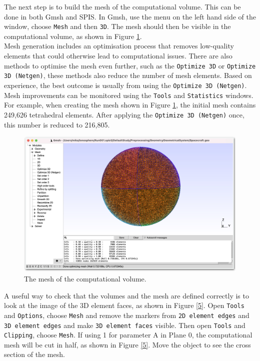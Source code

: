 \documentclass[a4paper, 12pt]{article}
\begin{document}
The next step is to build the mesh of the computational volume. This can be done in both Gmsh and SPIS. In Gmsh, use the menu on the left hand side of the window, choose \verb|Mesh| and then \verb|3D|. The mesh should then be visible in the computational volume, as shown in Figure \ref{4}.\\

Mesh generation includes an optimisation process that removes low-quality elements that could otherwise lead to computational issues. There are also methods to optimise the mesh even further, such as the \verb|Optimize 3D| or \verb|Optimize 3D (Netgen)|, these methods also reduce the number of mesh elements. Based on experience, the best outcome is usually from using the \verb|Optimize 3D (Netgen)|. Mesh improvements can be monitored using the \verb|Tools| and \verb|Statistics| windows. For example, when creating the mesh shown in Figure \ref{4}, the initial mesh contains 249,626 tetrahedral elements. After applying the \verb|Optimize 3D (Netgen)| once, this number is reduced to 216,805.

\begin{figure}[!ht]
    \centering
    \includegraphics[width=1\textwidth]{fig4.jpg}
    \caption{The mesh of the computational volume.}
    \label{4}
\end{figure}

A useful way to check that the volumes and the mesh are defined correctly is to look at the image of the 3D element faces, as shown in Figure \ref{5}. Open \verb|Tools| and \verb|Options|, choose \verb|Mesh| and remove the markers from \verb|2D element edges| and \verb|3D element edges| and make \verb|3D element faces| visible. Then open \verb|Tools| and \verb|Clipping|, choose \verb|Mesh|. If using 1 for parameter A in Plane 0, the computational mesh will be cut in half, as shown in Figure \ref{5}. Move the object to see the cross section of the mesh.\\
\end{document}

